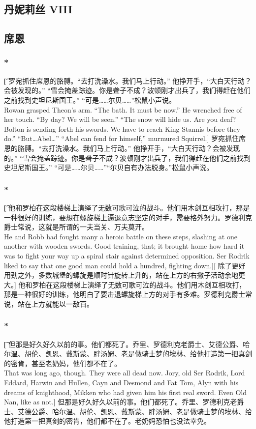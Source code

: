 \documentclass[12pt,a4paper]{article}
\begin{document}
\subsection{丹妮莉丝 VIII}

	
\subsection{席恩}
\subsubsection{\color{red}*}\t[
	罗宛抓住席恩的胳膊。“去打洗澡水。我们马上行动。”
	他挣开手，“大白天行动？会被发现的。”
	“雪会掩盖踪迹。你是聋子不成？波顿刚才出兵了，我们得赶在他们之前找到史坦尼斯国王。”
	“可是……尔贝……”松鼠小声说。\\
	Rowan grasped Theon's arm. “The bath. It must be now.”
	He wrenched free of her touch. “By day? We will be seen.”
	“The snow will hide us. Are you deaf? Bolton is sending forth his swords. We have to reach King Stannis before they do.”
	“But\ldots Abel\ldots”
	“Abel can fend for himself,” murmured Squirrel.]
	罗宛抓住席恩的胳膊。“去打洗澡水。我们马上行动。”
	他挣开手，“大白天行动？会被发现的。”
	“雪会掩盖踪迹。你是聋子不成？波顿刚才出兵了，我们得赶在他们之前找到史坦尼斯国王。”
	“可是……尔贝……”“尔贝自有办法脱身。”松鼠小声说。

\subsubsection{\color{red}*}\t[	
	他和罗柏在这段楼梯上演绎了无数可歌可泣的战斗。他们用木剑互相攻打，那是一种很好的训练，要想在螺旋梯上逼退意志坚定的对手，需要格外努力。罗德利克爵士常说，这就是所谓的一夫当关、万夫莫开。\\
	He and Robb had fought many a heroic battle on these steps, slashing at one another with wooden swords. Good training, that; it brought home how hard it was to fight your way up a spiral stair against determined opposition. Ser Rodrik liked to say that one good man could hold a hundred, fighting down.][
	除了更好用劲之外，多数城堡的螺旋是顺时针旋转上升的，站在上方的右撇子活动余地更大。]
	他和罗柏在这段楼梯上演绎了无数可歌可泣的战斗。他们用木剑互相攻打，那是一种很好的训练，他明白了要击退螺旋梯上方的对手有多难。罗德利克爵士常说，站在上方就能以一敌百。
	
\subsubsection{\color{red}*}\t[	
	但那是好久好久以前的事。他们都死了。乔里、罗德利克老爵士、艾德公爵、哈尔温、胡伦、凯恩、戴斯蒙、胖汤姆、老是做骑士梦的埃林、给他打造第一把真剑的密肯，甚至老奶妈，他们都不在了。\\
	That was long ago, though. They were all dead now. Jory, old Ser Rodrik, Lord Eddard, Harwin and Hullen, Cayn and Desmond and Fat Tom, Alyn with his dreams of knighthood, Mikken who had given him his first real sword. Even Old Nan, like as not.]
	但那是好久好久以前的事。他们都死了。乔里、罗德利克老爵士、艾德公爵、哈尔温、胡伦、凯恩、戴斯蒙、胖汤姆、老是做骑士梦的埃林、给他打造第一把真剑的密肯，他们都不在了。老奶妈恐怕也没法幸免。
		
\end{document}
